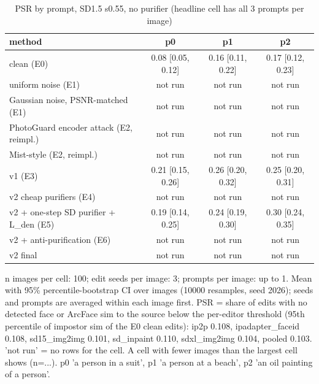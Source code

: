 \begin{table}[t]
\centering
\small
\begin{tabular}{lccc}
\toprule
method & p0 & p1 & p2 \\
\midrule
clean (E0) & 0.08 [0.05, 0.12] & 0.16 [0.11, 0.22] & 0.17 [0.12, 0.23] \\
uniform noise (E1) & not run & not run & not run \\
Gaussian noise, PSNR-matched (E1) & not run & not run & not run \\
PhotoGuard encoder attack (E2, reimpl.) & not run & not run & not run \\
Mist-style (E2, reimpl.) & not run & not run & not run \\
v1 (E3) & 0.21 [0.15, 0.26] & 0.26 [0.20, 0.32] & 0.25 [0.20, 0.31] \\
v2 cheap purifiers (E4) & not run & not run & not run \\
v2 + one-step SD purifier + L\_den (E5) & 0.19 [0.14, 0.25] & 0.24 [0.19, 0.30] & 0.30 [0.24, 0.35] \\
v2 + anti-purification (E6) & not run & not run & not run \\
v2 final & not run & not run & not run \\
\bottomrule
\end{tabular}
\caption{PSR by prompt, SD1.5 s0.55, no purifier (headline cell has all 3 prompts per image)}
\label{tab:per_prompt}
\par\footnotesize n images per cell: 100; edit seeds per image: 3; prompts per image: up to 1. Mean with 95\% percentile-bootstrap CI over images (10000 resamples, seed 2026); seeds and prompts are averaged within each image first. PSR = share of edits with no detected face or ArcFace sim to the source below the per-editor threshold (95th percentile of impostor sim of the E0 clean edits): ip2p 0.108, ipadapter\_faceid 0.108, sd15\_img2img 0.101, sd\_inpaint 0.110, sdxl\_img2img 0.104, pooled 0.103. 'not run' = no rows for the cell. A cell with fewer images than the largest cell shows (n=...). p0 'a person in a suit', p1 'a person at a beach', p2 'an oil painting of a person'.
\end{table}
